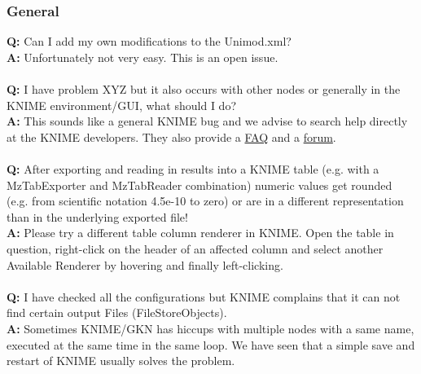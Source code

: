 \subsubsection{General}
\textbf{Q:} Can I add my own modifications to the Unimod.xml?\\
\textbf{A:} Unfortunately not very easy. This is an open issue.
\\\\
\textbf{Q:} I have problem XYZ but it also occurs with other nodes or generally in the KNIME environment/GUI, what should I do?\\
\textbf{A:} This sounds like a general KNIME bug and we advise to search help directly at the KNIME developers. They also provide a \href{https://tech.knime.org/
faq}{FAQ} and a \href{https://tech.knime.org/forum}{forum}.
\\\\
\textbf{Q:} After exporting and reading in results into a KNIME table (e.g. with a MzTabExporter and MzTabReader combination) numeric values get rounded (e.g. from scientific notation 4.5e-10 to zero) or are in a different representation than in the underlying exported file!\\
\textbf{A:} Please try a different table column renderer in KNIME. Open the table in question, right-click on the header of an affected column and select another Available Renderer by hovering and finally left-clicking.
\\\\
\textbf{Q:} I have checked all the configurations but KNIME complains that it can not find certain output Files (FileStoreObjects).\\
\textbf{A:} Sometimes KNIME/GKN has hiccups with multiple nodes with a same name, executed at the same time in the same loop. We have seen that a simple save and restart of KNIME usually solves the problem.

